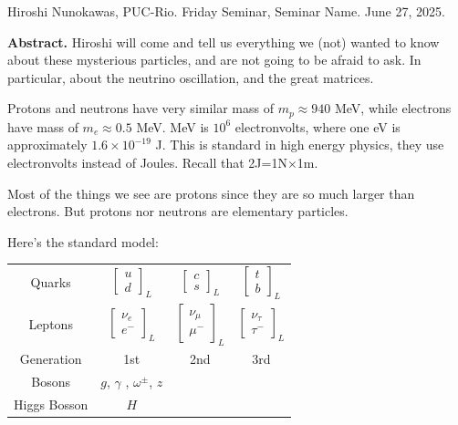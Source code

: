 \noindent
Hiroshi Nunokawas, PUC-Rio.
Friday Seminar, Seminar Name.
June 27, 2025.

\medskip\noindent
{\bf Abstract.} Hiroshi will come and tell us
everything we (not) wanted to know
about these mysterious particles, and are not
going to be afraid to ask. In
particular, about the neutrino oscillation,
and the great matrices.

\bigskip\noindent

Protons and neutrons have very similar mass
of $m_p\approx 940$ MeV, while
electrons have mass of $m_e \approx 0.5$ MeV.
MeV is $10^{6}$ electronvolts,
where one eV is approximately $1.6\times
10^{-19}$ J. This is standard in high
energy physics, they use electronvolts
instead of Joules. Recall that
2J=1N$\times$1m.

Most of the things we see are protons since
they are so much larger than
electrons. But protons nor neutrons are
elementary particles.

Here's the standard model:

\medskip

\begin{tabular}{c c c c}
Quarks & $\begin{bmatrix} u\\d
\end{bmatrix}_L $ & $\begin{bmatrix} c\\s
\end{bmatrix}_L$ & $\begin{bmatrix} t\\b
\end{bmatrix}_L$\\
Leptons & $\begin{bmatrix} \nu_e\\e^-
\end{bmatrix}_L $ & $\begin{bmatrix}
\nu_\mu\\ \mu^-
\end{bmatrix}_L$ & $\begin{bmatrix}
\nu_\tau\\ \tau^- \end{bmatrix}_L$\\
Generation & 1st & 2nd & 3rd\\
Bosons & $g$, $\gamma$ , $\omega^\pm$, $z$ \\
Higgs Bosson & $H$
\end{tabular}

\medskip

